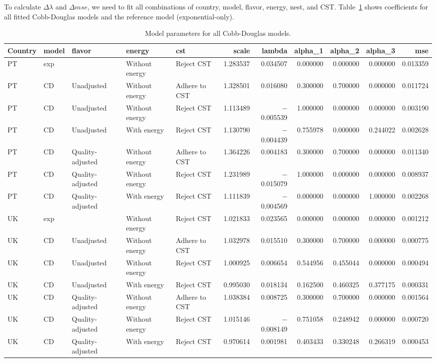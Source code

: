 \documentclass[preprint,authoryear,12pt]{elsarticle}\usepackage[]{graphicx}\usepackage[]{color}
\begin{document}
To calculate $\Delta \lambda$ and $\Delta mse$, we need to fit all combinations of 
country, model, flavor, energy, nest, and CST.
Table~\ref{tab:CD_coeffs} shows coefficients for all fitted Cobb-Douglas models
and the reference model (exponential-only).
%
\begin{table}[ht]
\centering
\caption{Model parameters for all Cobb-Douglas models.} 
\label{tab:CD_coeffs}
{\tiny
\begin{tabular}{lllllrrrrrr}
  \hline
Country & model & flavor & energy & cst & scale & lambda & alpha\_1 & alpha\_2 & alpha\_3 & mse \\ 
  \hline
PT & exp &  & Without energy & Reject CST & 1.283537 & 0.034507 & 0.000000 & 0.000000 & 0.000000 & 0.013359 \\ 
  PT & CD & Unadjusted & Without energy & Adhere to CST & 1.328501 & 0.016080 & 0.300000 & 0.700000 & 0.000000 & 0.011724 \\ 
  PT & CD & Unadjusted & Without energy & Reject CST & 1.113489 & $-$0.005539 & 1.000000 & 0.000000 & 0.000000 & 0.003190 \\ 
  PT & CD & Unadjusted & With energy & Reject CST & 1.130790 & $-$0.004439 & 0.755978 & 0.000000 & 0.244022 & 0.002628 \\ 
  PT & CD & Quality-adjusted & Without energy & Adhere to CST & 1.364226 & 0.004183 & 0.300000 & 0.700000 & 0.000000 & 0.011340 \\ 
  PT & CD & Quality-adjusted & Without energy & Reject CST & 1.231989 & $-$0.015079 & 1.000000 & 0.000000 & 0.000000 & 0.008937 \\ 
  PT & CD & Quality-adjusted & With energy & Reject CST & 1.111839 & $-$0.004569 & 0.000000 & 0.000000 & 1.000000 & 0.002268 \\ 
  UK & exp &  & Without energy & Reject CST & 1.021833 & 0.023565 & 0.000000 & 0.000000 & 0.000000 & 0.001212 \\ 
  UK & CD & Unadjusted & Without energy & Adhere to CST & 1.032978 & 0.015510 & 0.300000 & 0.700000 & 0.000000 & 0.000775 \\ 
  UK & CD & Unadjusted & Without energy & Reject CST & 1.000925 & 0.006654 & 0.544956 & 0.455044 & 0.000000 & 0.000494 \\ 
  UK & CD & Unadjusted & With energy & Reject CST & 0.995030 & 0.018134 & 0.162500 & 0.460325 & 0.377175 & 0.000331 \\ 
  UK & CD & Quality-adjusted & Without energy & Adhere to CST & 1.038384 & 0.008725 & 0.300000 & 0.700000 & 0.000000 & 0.001564 \\ 
  UK & CD & Quality-adjusted & Without energy & Reject CST & 1.015146 & $-$0.008149 & 0.751058 & 0.248942 & 0.000000 & 0.000720 \\ 
  UK & CD & Quality-adjusted & With energy & Reject CST & 0.970614 & 0.001981 & 0.403433 & 0.330248 & 0.266319 & 0.000453 \\ 
   \hline
\end{tabular}
}
\end{table}
\end{document}
